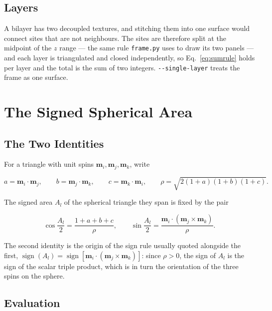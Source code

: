\documentclass[12pt, a4paper, oneside]{article}
\newcommand{\mvec}{\mathbf{m}}
\begin{document}
\subsection{Layers}

A bilayer has two decoupled textures, and stitching them into one surface would
connect sites that are not neighbours. The sites are therefore split at the
midpoint of the $z$ range --- the same rule \texttt{frame.py} uses to draw its
two panels --- and each layer is triangulated and closed independently, so
Eq.~\eqref{eq:sumrule} holds per layer and the total is the sum of two
integers. \texttt{-\/-single-layer} treats the frame as one surface.

\section{The Signed Spherical Area}
\label{sec:area}

\subsection{The Two Identities}

For a triangle with unit spins $\mvec_i,\mvec_j,\mvec_k$, write

\begin{equation}
    a = \mvec_i\cdot\mvec_j, \qquad
    b = \mvec_j\cdot\mvec_k, \qquad
    c = \mvec_k\cdot\mvec_i, \qquad
    \rho = \sqrt{2(1+a)(1+b)(1+c)} .
\end{equation}

The signed area $A_l$ of the spherical triangle they span is fixed by the pair

\begin{equation}
\boxed{
    \cos\frac{A_l}{2} = \frac{1 + a + b + c}{\rho},
    \qquad
    \sin\frac{A_l}{2} = \frac{\mvec_i\cdot(\mvec_j\times\mvec_k)}{\rho} .
}
\label{eq:pair}
\end{equation}

The second identity is the origin of the sign rule usually quoted alongside the
first,
$\operatorname{sign}(A_l) = \operatorname{sign}[\mvec_i\cdot(\mvec_j\times\mvec_k)]$:
since $\rho>0$, the sign of $A_l$ is the sign of the scalar triple product,
which is in turn the orientation of the three spins on the sphere.

\subsection{Evaluation}
\end{document}

